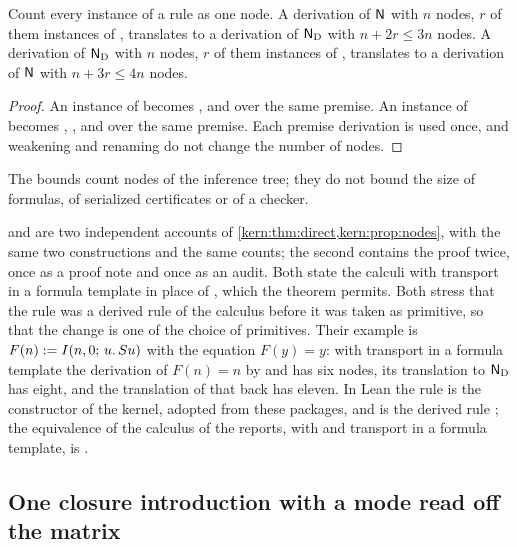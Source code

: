 \begin{proposition}
\label{kern:prop:nodes}
Count every instance of a rule as one node.  A derivation of $\mathsf{N}$ with $n$
nodes, $r$ of them instances of , translates to a derivation of
$\mathsf{N}_{\mathrm{D}}$ with $n+2r\le 3n$ nodes.  A derivation of
$\mathsf{N}_{\mathrm{D}}$ with $n$ nodes, $r$ of them instances of ,
translates to a derivation of $\mathsf{N}$ with $n+3r\le 4n$ nodes.
\end{proposition}

\begin{proof}
An instance of  becomes ,  and
 over the same premise.  An instance of  becomes
, ,  and  over the same
premise.  Each premise derivation is used once, and weakening and renaming do
not change the number of nodes.
\end{proof}

The bounds count nodes of the inference tree; they do not bound the size of
formulas, of serialized certificates or of a checker.

\begin{remark}[Sources]
\label{kern:rem:direct-sources}
 and  are two
independent accounts of \cref{kern:thm:direct,kern:prop:nodes}, with the same
two constructions and the same counts; the second contains the proof twice,
once as a proof note and once as an audit.  Both state the calculi with
transport in a formula template in place of , which the theorem
permits.  Both stress that the rule  was a derived rule of the
calculus before it was taken as primitive, so that the change is one of the
choice of primitives.  Their example is $F(n)\mathrel{:=}I(n,0;\,u.\,S u)$ with
the equation $F(y)=y$: with transport in a formula template the derivation of
$F(n)=n$ by  and  has six nodes, its translation to
$\mathsf{N}_{\mathrm{D}}$ has eight, and the translation of that back has eleven.
In Lean the rule  is the constructor  of the kernel,
adopted from these packages, and  is the derived rule
; the equivalence of the calculus of the reports, with
 and transport in a formula template, is .
\end{remark}

\subsection{One closure introduction with a mode read off the matrix}
\label{kern:sec:det}

